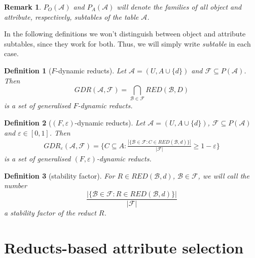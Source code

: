 \documentclass[12pt]{pracamgr}
\newtheorem{definition}{Definition}[chapter]
\newtheorem{remark}{Remark}[chapter]
\begin{document}
\begin{remark}

  $P_O(\mathcal{A})$ and $P_A(\mathcal{A})$ will denote the families of all object and
  attribute, respectively, subtables of the table $\mathcal{A}$.

\end{remark}

In the following definitions we won't distinguish between object and attribute subtables,
since they work for both. Thus, we will simply write \emph{subtable} in each case.

\begin{definition}[$F$-dynamic reducts]

  Let $\mathcal{A} = (U, A \cup \{d\})$ and $\mathcal{F} \subseteq P(\mathcal{A})$. Then
  $$
  GDR(\mathcal{A},\mathcal{F}) = \bigcap_{\mathcal{B} \in \mathcal{F}} RED(\mathcal{B}, D)
  $$
  is a set of \emph{generalised $F$-dynamic reducts}.
  
\end{definition}

\begin{definition}[$(F,\varepsilon)$-dynamic reducts]

  Let $\mathcal{A} = (U, A \cup \{d\})$, $\mathcal{F} \subseteq P(\mathcal{A})$ and
  $\varepsilon \in [0, 1]$. Then
  \begin{align*}
  GDR_\varepsilon(\mathcal{A},\mathcal{F}) = \{C \subseteq A :
  \frac{|\{\mathcal{B} \in \mathcal{F} : C \in RED(\mathcal{B}, d)\}|}{|\mathcal{F}|} \geq 
  1 - \varepsilon \}
  \end{align*}
  is a set of \emph{generalised $(F,\varepsilon)$-dynamic reducts}.
  
\end{definition}

\begin{definition}[stability factor]

  For $R \in RED(\mathcal{B},d)$, $\mathcal{B} \in \mathcal{F}$, we will call the number
  $$ \frac{|\{\mathcal{B} \in \mathcal{F} : R \in RED(\mathcal{B}, d)\}|}{|\mathcal{F}|} $$
  a \emph{stability factor} of the reduct $R$.
  
\end{definition}


\chapter{Reducts-based attribute selection}
\label{chap:reductsattrsel}
\end{document}
